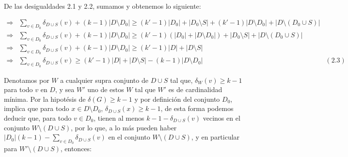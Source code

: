 \documentclass{article}
\begin{document}
De las desigualdades 2.1 y 2.2, sumamos y obtenemos lo siguiente:
    
\begin{align*}
\Longrightarrow & \sum_{v\in D_{0}} \delta_{D \cup S}(v) + (k-1)|D \setminus D_{0}| \geq (k'-1)|D_{0}| + |D_{0}\setminus S| + (k'-1)|D\setminus D_{0}| + |D\setminus (D_{0} \cup S)|\\
\Longrightarrow & \sum_{v\in D_{0}} \delta_{D \cup S}(v) + (k-1)|D \setminus D_{0}| \geq (k'-1)(|D_{0}| + |D\setminus D_{0}|) + |D_{0}\setminus S| + |D \setminus (D_{0}\cup S)|\\
\Longrightarrow & \sum_{v\in D_{0}} \delta_{D \cup S}(v) + (k-1)|D \setminus D_{0}| \geq (k'-1)|D| + |D\setminus S| \\
\Longrightarrow & \sum_{v\in D_{0}} \delta_{D \cup S}(v) \geq (k'-1)|D| + |D\setminus S| - (k-1)|D \setminus D_{0}| & (2.3)
\end{align*}

Denotamos por $W$ a cualquier supra conjunto de $D\cup S$ tal que, $\delta_W(v)\ge k-1$ para todo $v$ en $D$, y sea $W'$ uno de estos $W$ tal que $W'$ es de cardinalidad mínima. Por la hipotésis de $\delta(G)\geq k-1$ y por definición del conjunto $D_{0}$, implica que para todo $x \in D\setminus D_{0}$, $\delta_{D\cup S}(x) \geq k-1$, de esta forma podemos deducir que, para todo $v \in D_{0}$, tienen al menos $k-1-\delta_{D\cup S}(v)$ vecinos en el conjunto $W\setminus (D\cup S)$, por lo que, a lo más pueden haber $|D_{0}|(k-1) - \sum_{v\in D_{0}} \delta_{D\cup S}(v)$ en el conjunto $W\setminus (D\cup S)$, y en particular para $W'\setminus (D\cup S)$, entonces:\\
\end{document}

